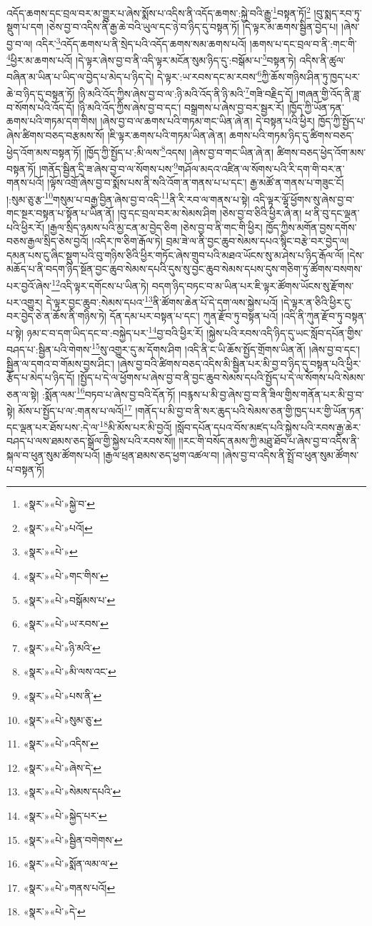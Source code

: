 འདོད་ཆགས་དང་བྲལ་བར་མ་གྱུར་པ་ཞེས་སྨོས་པ་འདིས་ནི་འདོད་ཆགས་:སྐྱེ་བའི་རྒྱུ་\footnote{«སྣར་»«པེ་»སྐྱེ་བ་}བསྟན་ཏོ།\footnote{«སྣར་»«པེ་»པའོ།} །བུ་སྨད་རབ་ཏུ་སྡུག་པ་དག །ཅེས་བྱ་བ་འདིས་ནི་རྒྱ་ཆེ་བའི་ཡུལ་དང་ཉེ་བ་ཉིད་དུ་བསྟན་ཏོ། །དེ་ལྟར་མ་ཆགས་སྦྱིན་བྱེད་པ། །ཞེས་བྱ་བ་ལ། འདིར་\footnote{«སྣར་»«པེ་»}འདོད་ཆགས་པ་ནི་སྲེད་པའི་འདོད་ཆགས་སམ་ཆགས་པའོ། །ཆགས་པ་དང་བྲལ་བ་ནི་:གང་གི་\footnote{«སྣར་»«པེ་»གང་གིས་}ཕྱིར་མ་ཆགས་པའོ། །དེ་ལྟར་ཞེས་བྱ་བ་ནི་འདི་ལྟར་མངོན་སུམ་ཉིད་དུ་:བསྒོམ་པ་\footnote{«སྣར་»«པེ་»བསྒོམས་པ་}བསྟན་ཏེ། འདིས་ནི་ཚུལ་བཞིན་མ་ཡིན་པ་ཡིད་ལ་བྱེད་པ་མེད་པ་ཉིད་དེ། དེ་ལྟར་:ཡ་རབས་དང་མ་རབས་\footnote{«སྣར་»«པེ་»ཡ་རབས་}ཀྱི་ཆོས་གཉིས་ཤིན་ཏུ་ཁྱད་པར་ཆེ་བ་ཉིད་དུ་བསྟན་ཏོ། །ཉི་མའི་འོད་ཀྱིས་ཞེས་བྱ་བ་ལ་:ཉི་མའི་འོད་ནི་ཉི་མའི་\footnote{«སྣར་»«པེ་»ཉི་མའི་}གཟི་བརྗིད་དོ། །གཞན་གྱི་འོད་ནི་ཟླ་བ་སོགས་པའི་འོད་དོ། །ཉི་མའི་འོད་ཀྱིས་ཞེས་བྱ་བ་དང་། བསྒྲགས་པ་ཞེས་བྱ་བར་སྦྱར་རོ། །ཁྱོད་ཀྱི་ཡོན་ཏན་ཆགས་པའི་གཏམ་དག་གིས། །ཞེས་བྱ་བ་ལ་ཆགས་པའི་གཏམ་གང་ཡིན་ཞེ་ན། དེ་བསྟན་པའི་ཕྱིར། ཁྱོད་ཀྱི་སྤྱོད་པ་ཞེས་ཚིགས་བཅད་བརྩམས་སོ། །ཇི་ལྟར་ཆགས་པའི་གཏམ་ཡིན་ཞེ་ན། ཆགས་པའི་གཏམ་ཉིད་དུ་ཚིགས་བཅད་ཕྱེད་འོག་མས་བསྟན་ཏོ། །ཁྱོད་ཀྱི་སྤྱོད་པ་:མི་ལས་\footnote{«སྣར་»«པེ་»མི་ལས་འང་}འདས། །ཞེས་བྱ་བ་གང་ཡིན་ཞེ་ན། ཚིགས་བཅད་ཕྱེད་འོག་མས་བསྟན་ཏོ། །གནོད་སྦྱིན་དྲི་ཟ་ཞེས་བྱ་བ་ལ་སོགས་པས་\footnote{«སྣར་»«པེ་»པས་ནི་}གཤོལ་མདའ་འཛིན་ལ་སོགས་པའི་རི་དག་གི་བར་ན་གནས་པའོ། །ལྟོས་འགྲོ་ཞེས་བྱ་བ་སྨོས་པས་ནི་སའི་འོག་ན་གནས་པ་པ་དང་། རྒྱ་མཚོ་ན་གནས་པ་གཟུང་ངོ། །:སུམ་ཅུ་རྩ་\footnote{«སྣར་»«པེ་»སུམ་ཅུ་}གསུམ་པ་བརྒྱ་བྱིན་ཞེས་བྱ་བ་འདི་\footnote{«སྣར་»«པེ་»འདིས་}ནི་རི་རབ་ལ་གནས་པ་སྟེ། འདི་ལྟར་ལྷོ་ཕྱོགས་སུ་ཞེས་བྱ་བ་གང་སྔར་བསྟན་པ་སྟོན་པ་ཡིན་ནོ། །བུ་དང་བྲལ་བར་མ་སེམས་ཤིག །ཅེས་བྱ་བ་ཅིའི་ཕྱིར་ཞེ་ན། ཕ་ནི་བུ་དང་ལྡན་པའི་ཕྱིར་རོ། །རྒྱལ་སྲིད་ཉམས་པའི་མྱ་ངན་མ་བྱེད་ཅིག །ཅེས་བྱ་བ་ནི་གང་གི་ཕྱིར། ཁྱོད་ཀྱིས་མགོན་བྱས་དགོས་བཅས་རྒྱལ་སྲིད་ཅེས་བྱའོ། །འདིར་ཁ་ཅིག་རྒོལ་ཏེ། བྲམ་ཟེ་ལ་ནི་བྱང་ཆུབ་སེམས་དཔའ་སྙིང་བརྩེ་བར་བྱེད་ལ། དམན་པས་ངུ་ཞིང་སྡུག་པའི་བུ་གཉིས་ཅིའི་ཕྱིར་གཏོང་ཞེས་གྲུབ་པའི་མཐའ་ཡོངས་སུ་མ་ཤེས་པ་ཉིད་རྒོལ་ལོ། །དེས་མཆོད་པ་ནི་བདག་ཉིད་སྔོན་བྱང་ཆུབ་སེམས་དཔའི་དུས་སུ་བྱང་ཆུབ་སེམས་དཔས་དུས་གཅིག་ཏུ་ཚོགས་བསགས་པར་བྱའོ་ཞེས་\footnote{«སྣར་»«པེ་»ཞེས་དེ་}འདི་ལྟར་དགོངས་པ་ཡིན་ཏེ། བདག་ཉིད་བཏང་བ་མ་ཡིན་པར་ཇི་ལྟར་ཚོགས་ཡོངས་སུ་རྫོགས་པར་འགྱུར། དེ་ལྟར་བྱང་ཆུབ་:སེམས་དཔའ་\footnote{«སྣར་»«པེ་»སེམས་དཔའི་}ནི་ཚོགས་ཆེན་པོ་དེ་དག་ལས་སྐྱེས་པའོ། །དེ་ལྟར་ན་ཅིའི་ཕྱིར་ངུ་བར་བྱེད་ཅེ་ན་ཆོས་ནི་གཉིས་ཏེ། དོན་དམ་པར་བསྟན་པ་དང་། ཀུན་རྫོབ་ཏུ་བསྟན་པའོ། །འདི་ནི་ཀུན་རྫོབ་ཏུ་བསྟན་པ་སྟེ། ཉམ་ང་བ་དག་ཡིད་དང་བ་:བསྐྱེད་པར་\footnote{«སྣར་»«པེ་»སྐྱེད་པར་}བྱ་བའི་ཕྱིར་རོ། །སྐྱེས་པའི་རབས་འདི་ཉིད་དུ་ཡང་སློབ་དཔོན་གྱིས་བཤད་པ་:སྦྱིན་པའི་གེགས་\footnote{«སྣར་»«པེ་»སྦྱིན་བགེགས་}སུ་འགྱུར་དུ་མ་དོགས་ཤིག །འདི་ནི་ང་ཡི་ཆོས་སྤྱོད་གྲོགས་ཡིན་ནོ། །ཞེས་བྱ་བ་དང་། སྦྱིན་ལ་དགའ་བ་གོམས་བྱས་ཤིང་། །ཞེས་བྱ་བའི་ཚིགས་བཅད་འདིས་མི་སྦྱིན་པར་མི་བྱ་བ་ཉིད་དུ་བསྟན་པའི་ཕྱིར་རྩོད་པ་མེད་པ་ཉིད་དོ། །སྤྱོད་པ་དེ་ལ་ཕྱོགས་པ་ཞེས་བྱ་བ་ནི་བྱང་ཆུབ་སེམས་དཔའི་སྤྱོད་པ་དེ་ལ་སོགས་པའི་སེམས་ཅན་ལ་སྟེ། :སྨོན་ལམ་\footnote{«སྣར་»«པེ་»སྨོན་ལམ་ལ་}བཏབ་པ་ཞེས་བྱ་བའི་དོན་ཏོ། །བརྙས་པ་མི་བྱ་ཞེས་བྱ་བ་ནི་ཟིལ་གྱིས་གནོན་པར་མི་བྱ་བ་སྟེ། མོས་པ་སྤྱོད་པ་ལ་:གནས་པ་ལའོ།\footnote{«སྣར་»«པེ་»གནས་པའོ།} །གནོད་པ་མི་བྱ་བ་ནི་སར་ཆུད་པའི་སེམས་ཅན་གྱི་ཁྱད་པར་གྱི་ཡོན་ཏན་དང་ལྡན་པར་ཐོས་པས་:དེ་ལ་\footnote{«སྣར་»«པེ་»དེ་}མི་མོས་པར་མི་བྱའོ། །སློབ་དཔོན་དཔའ་བོས་མཛད་པའི་སྐྱེས་པའི་རབས་རྒྱ་ཆེར་བཤད་པ་ལས་ཐམས་ཅད་སྒྲོལ་གྱི་སྐྱེས་པའི་རབས་སོ།། །།རང་གི་བསོད་ནམས་ཀྱི་མཐུ་ཐོབ་པ་ཞེས་བྱ་བ་འདིས་ནི་སྐལ་བ་ཕུན་སུམ་ཚོགས་པའོ། །རྒྱལ་ཕྲན་ཐམས་ཅད་ཕྱག་འཚལ་བ། །ཞེས་བྱ་བ་འདིས་ནི་སྤྲོ་བ་ཕུན་སུམ་ཚོགས་པ་བསྟན་ཏོ། 